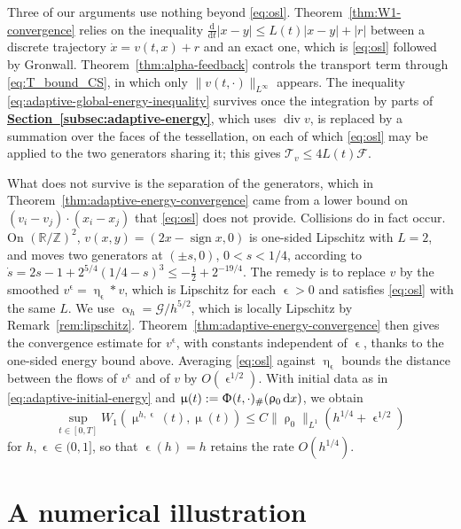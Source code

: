 \documentclass[letterpaper,11pt,twoside]{article}
\numberwithin{figure}{section}
\numberwithin{table}{section}
\theoremstyle{cpamplain}
\theoremstyle{cpamdefinition}
\newcommand{\R}{\mathbb{R}}
\newcommand{\diff}{\mathrm{d}}
\newcommand{\Secref}[1]{\textbf{\hyperref[#1]{Section~\ref*{#1}}}}
\let\alpha\upalpha
\let\varepsilon\upvarepsilon
\let\eta\upeta
\let\mu\upmu
\let\rho\uprho
\let\Phi\Upphi
\renewcommand{\le}{\leqslant}
\numberwithin{equation}{section}
\begin{document}
Three of our arguments use nothing beyond \eqref{eq:osl}.
Theorem~\ref{thm:W1-convergence} relies on the inequality $\frac{\diff}{\diff t}|x-y|\le L(t)|x-y|+|r|$ between a discrete trajectory $\dot x=v(t,x)+r$ and an exact one, which is \eqref{eq:osl} followed by Gronwall.
Theorem~\ref{thm:alpha-feedback} controls the transport term through \eqref{eq:T_bound_CS}, in which only $\|v(t,\cdot)\|_{L^\infty}$ appears.
The inequality \eqref{eq:adaptive-global-energy-inequality} survives once the integration by parts of \Secref{subsec:adaptive-energy}, which uses $\operatorname{div}v$, is replaced by a summation over the faces of the tessellation, on each of which \eqref{eq:osl} may be applied to the two generators sharing it; this gives $\mathscr T_v\le4L(t)\mathscr F$.

What does not survive is the separation of the generators, which in Theorem~\ref{thm:adaptive-energy-convergence} came from a lower bound on $(v_i-v_j)\cdot(x_i-x_j)$ that \eqref{eq:osl} does not provide.
Collisions do in fact occur. On $(\R/\mathbb Z)^2$,  $v(x,y)=(2x-\operatorname{sign}x,0)$ is one-sided Lipschitz with $L=2$, and moves two generators at $(\pm s,0)$, $0<s<1/4$, according to $\dot s=2s-1+2^{5/4}(1/4-s)^3\le-\frac12+2^{-19/4}$.
The remedy is to replace $v$ by the smoothed  $v^\varepsilon=\eta_\varepsilon*v$, which is Lipschitz for each $\varepsilon>0$ and satisfies \eqref{eq:osl} with the same $L$.
We use $\alpha_h=\mathscr G/h^{5/2}$, which is locally Lipschitz by Remark~\ref{rem:lipschitz}.
Theorem~\ref{thm:adaptive-energy-convergence} then gives the convergence estimate for $v^\varepsilon$, with constants independent of $\varepsilon$, thanks to the one-sided energy bound above.
Averaging \eqref{eq:osl} against $\eta_\varepsilon$ bounds the distance between the flows of $v^\varepsilon$ and of $v$ by $O(\varepsilon^{1/2})$.
With initial data as in \eqref{eq:adaptive-initial-energy} and $\mu(t):=\Phi(t,\cdot)_\#(\rho_0\,\diff x)$, we obtain
\begin{equation}\label{eq:osl-convergence}
\sup_{t\in[0,T]}W_1\left(\mu^{h,\varepsilon}(t),\mu(t)\right)\le C\|\rho_0\|_{L^1}\left(h^{1/4}+\varepsilon^{1/2}\right)
\end{equation}
for $h,\varepsilon\in(0,1]$, so that $\varepsilon(h)=h$ retains the rate $O(h^{1/4})$.

\FloatBarrier
\section{A numerical illustration} \label{sec:num}
\end{document}
